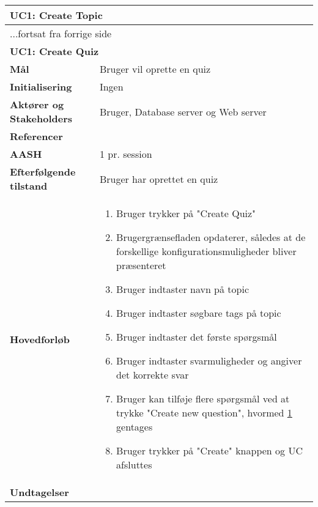 \begin{center} \centering \label{ucCreateTopic}
	\begin{longtable}{|p{4.6cm}|p{9.4cm}|}  %
	\hline
		\multicolumn{2}{|l|}{\textbf{UC1: Create Topic}} \\\hline
		\endfirsthead
		
		\multicolumn{2}{l}{...fortsat fra forrige side} \\ \hline %
		\multicolumn{2}{|l|}{\textbf{UC1: Create Quiz}} \\\hline
		\endhead	
		
		\textbf{Mål}						&Bruger vil oprette en quiz
		\\\hline
		\textbf{Initialisering}			&Ingen
		\\\hline
		\textbf{Aktører og Stakeholders}	&Bruger, Database server og Web server
		\\\hline 
		\textbf{Referencer}				&%
		\\\hline
		\textbf{AASH}					&1 pr. session
		\\\hline
		\textbf{Efterfølgende tilstand}	&Bruger har oprettet en quiz
		\\\hline
		\textbf{Hovedforløb}					
			&\begin{enumerate}
				\item Bruger trykker på "Create Quiz"
				\item Brugergrænsefladen opdaterer, således at de forskellige konfigurationsmuligheder bliver præsenteret
				\item Bruger indtaster navn på topic
				\item Bruger indtaster søgbare tags på topic
				\item \label{ucPunktLabelSpm} Bruger indtaster det første spørgsmål
				\item Bruger indtaster svarmuligheder og angiver det korrekte svar
				\item Bruger kan tilføje flere spørgsmål ved at trykke "Create new question", hvormed \ref{ucPunktLabelSpm} gentages
				\item Bruger trykker på "Create" knappen og UC afsluttes
				
			\end{enumerate}\\\hline
		\textbf{Undtagelser}
			&			
			\\\hline
	\end{longtable} 
\end{center}